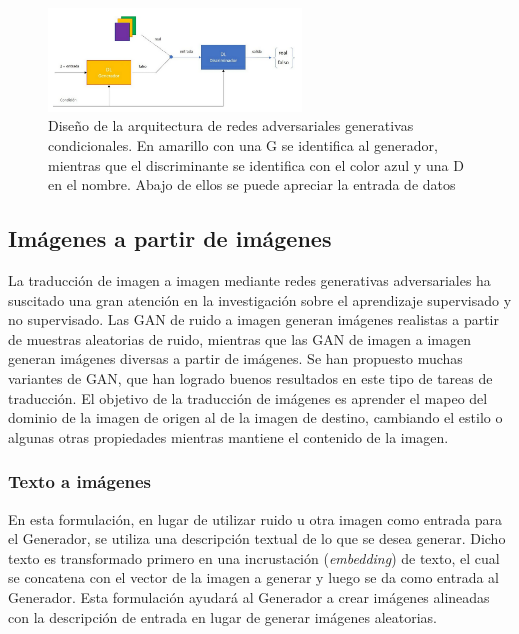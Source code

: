 \begin{figure}[ht!]
    \centering
    \includegraphics[width=0.6\textwidth]{Graphics/cgan-design.png}
    \caption{Diseño de la arquitectura de redes adversariales generativas condicionales. En amarillo con una G se identifica al generador, mientras que el discriminante se identifica con el color azul y una D en el nombre. Abajo de ellos se puede apreciar la entrada de datos}
    \label{fig:cgan-design}
\end{figure}

\subsection{Imágenes a partir de imágenes}
La traducción de imagen a imagen mediante redes generativas adversariales ha suscitado una gran atención en la investigación sobre el aprendizaje supervisado y no supervisado. Las GAN de ruido a imagen generan imágenes realistas a partir de muestras aleatorias de ruido, mientras que las GAN de imagen a imagen generan imágenes diversas a partir de imágenes. Se han propuesto muchas variantes de GAN, que han logrado buenos resultados en este tipo de tareas de traducción.
El objetivo de la traducción de imágenes es aprender el mapeo del dominio de la imagen de origen al de la imagen de destino, cambiando el estilo o algunas otras propiedades mientras mantiene el contenido de la imagen.
\subsubsection{Texto a imágenes}
En esta formulación, en lugar de utilizar ruido u otra imagen como entrada para el Generador, se utiliza una descripción textual de lo que se desea generar. Dicho texto es transformado primero en una incrustación (\textit{embedding}) de texto, el cual se concatena con el vector de la imagen a generar y luego se da como entrada al Generador.  Esta formulación ayudará al Generador a crear imágenes alineadas con la descripción de entrada en lugar de generar imágenes aleatorias.

